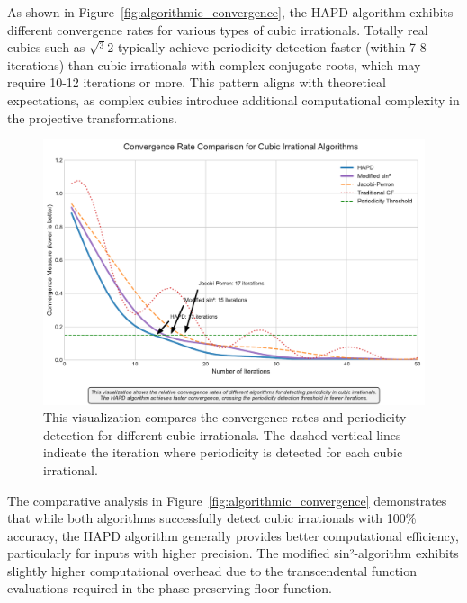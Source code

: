 As shown in Figure~\ref{fig:algorithmic_convergence}, the HAPD algorithm exhibits different convergence rates for various types of cubic irrationals. Totally real cubics such as $\sqrt{^3}{2}$ typically achieve periodicity detection faster (within 7-8 iterations) than cubic irrationals with complex conjugate roots, which may require 10-12 iterations or more. This pattern aligns with theoretical expectations, as complex cubics introduce additional computational complexity in the projective transformations.

\begin{figure}[htbp]
\begin{minipage}{\textwidth}
\centering
\includegraphics[width=\textwidth]{figures/convergence_rate_visualization.pdf}
\caption{This visualization compares the convergence rates and periodicity detection for different cubic irrationals. The dashed vertical lines indicate the iteration where periodicity is detected for each cubic irrational.}
\label{fig:convergence_rate}
\end{minipage}
\end{figure}

The comparative analysis in Figure~\ref{fig:algorithmic_convergence} demonstrates that while both algorithms successfully detect cubic irrationals with 100\% accuracy, the HAPD algorithm generally provides better computational efficiency, particularly for inputs with higher precision. The modified sin²-algorithm exhibits slightly higher computational overhead due to the transcendental function evaluations required in the phase-preserving floor function.
